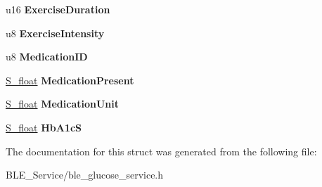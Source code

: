\begin{DoxyCompactItemize}
\item 
u16 {\bfseries Exercise\+Duration}\hypertarget{struct_b_l_e___g_l_u_c_o_s_e___measurement___context_a4761bbe6321848a32db30f153c39f2f2}{}\label{struct_b_l_e___g_l_u_c_o_s_e___measurement___context_a4761bbe6321848a32db30f153c39f2f2}

\item 
u8 {\bfseries Exercise\+Intensity}\hypertarget{struct_b_l_e___g_l_u_c_o_s_e___measurement___context_a35d7049b8c4cb44b6530d6a721aa5ce1}{}\label{struct_b_l_e___g_l_u_c_o_s_e___measurement___context_a35d7049b8c4cb44b6530d6a721aa5ce1}

\item 
u8 {\bfseries Medication\+ID}\hypertarget{struct_b_l_e___g_l_u_c_o_s_e___measurement___context_ac8efd71ace324e69bddeb94b2b9d92df}{}\label{struct_b_l_e___g_l_u_c_o_s_e___measurement___context_ac8efd71ace324e69bddeb94b2b9d92df}

\item 
\hyperlink{struct_s__float}{S\+\_\+float} {\bfseries Medication\+Present}\hypertarget{struct_b_l_e___g_l_u_c_o_s_e___measurement___context_af2049dc2c433d631db47f527e4e62138}{}\label{struct_b_l_e___g_l_u_c_o_s_e___measurement___context_af2049dc2c433d631db47f527e4e62138}

\item 
\hyperlink{struct_s__float}{S\+\_\+float} {\bfseries Medication\+Unit}\hypertarget{struct_b_l_e___g_l_u_c_o_s_e___measurement___context_aa478056a8a9818678e85a0ba18c6dbcc}{}\label{struct_b_l_e___g_l_u_c_o_s_e___measurement___context_aa478056a8a9818678e85a0ba18c6dbcc}

\item 
\hyperlink{struct_s__float}{S\+\_\+float} {\bfseries Hb\+A1cS}\hypertarget{struct_b_l_e___g_l_u_c_o_s_e___measurement___context_ae741f8671b1cd2ff2837ff5cfac0062a}{}\label{struct_b_l_e___g_l_u_c_o_s_e___measurement___context_ae741f8671b1cd2ff2837ff5cfac0062a}

\end{DoxyCompactItemize}


The documentation for this struct was generated from the following file\+:\begin{DoxyCompactItemize}
\item 
B\+L\+E\+\_\+\+Service/ble\+\_\+glucose\+\_\+service.\+h\end{DoxyCompactItemize}
